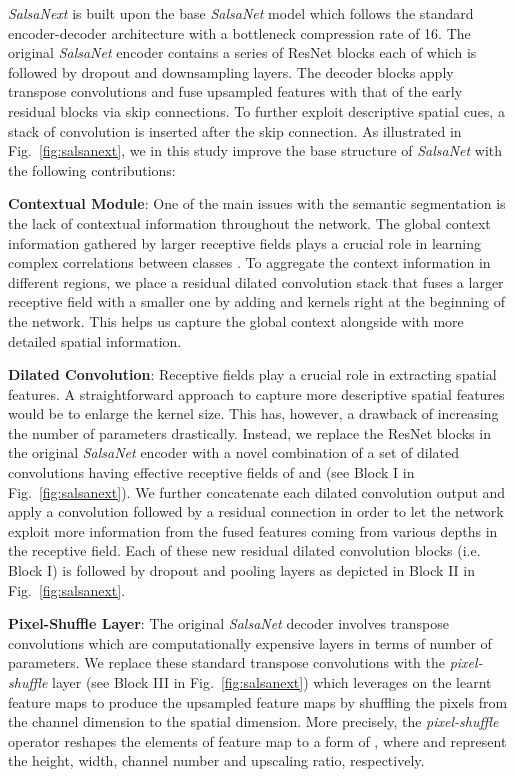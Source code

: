\documentclass[letterpaper, 10 pt, conference]{ieeeconf}
\makeatletter
\newcommand{\snx}[1]{\textit{SalsaNext }{#1}}
\newcommand{\sn}[1]{\textit{SalsaNet }{#1}}
\def\ie{i.e.\@\xspace}
\makeatother
\begin{document}
\snx  is built upon the base  \sn model \cite{salsanet2020} which follows the standard encoder-decoder architecture with a bottleneck compression rate of 16. The original \sn encoder contains a series of ResNet blocks \cite{resnet2016} each of which 
is followed by dropout and downsampling layers. 
The decoder blocks apply  transpose convolutions and fuse upsampled features with that of the early residual blocks via skip connections. To further exploit descriptive spatial cues, a stack  of convolution is inserted  after the skip connection. 
As illustrated in Fig.~\ref{fig:salsanext},   we in this study  improve  the base structure of \sn with the following contributions:





\textbf{Contextual Module}: 
One of the main issues with the semantic segmentation is the lack of contextual information throughout the network.
The global context information gathered by larger receptive fields plays a crucial role in learning complex correlations between classes \cite{FastSCNN2019}.  
To aggregate the context information in different regions, we place a residual dilated convolution stack that fuses a larger receptive field with a smaller one by adding   and      kernels right at the beginning of the network. This  helps us capture the global context alongside with more detailed spatial information. 
 
\textbf{Dilated Convolution}: Receptive fields play a crucial role in extracting spatial features. A  straightforward approach to capture more descriptive spatial features would be to enlarge the kernel size. This has, however, a drawback of increasing the number of parameters drastically. Instead, we replace  the ResNet blocks in the original \sn encoder with a novel combination of a set of dilated convolutions having effective receptive fields of  and  (see Block I in Fig.~\ref{fig:salsanext}). We further concatenate each  dilated convolution output and apply a  convolution followed by a residual connection in order to let the network   exploit more information from the fused features coming from various depths in the receptive field. 
Each of these new residual dilated convolution blocks (\ie Block I) is followed by dropout and pooling layers as depicted in Block II in Fig.~\ref{fig:salsanext}. 

\textbf{Pixel-Shuffle Layer}:
The original \sn decoder involves transpose convolutions which are computationally expensive layers in terms of number of parameters. We replace these standard transpose convolutions with the \textit{pixel-shuffle} layer \cite{pixelshuffle} (see Block III in Fig.~\ref{fig:salsanext}) which leverages on the learnt feature maps to produce the upsampled feature maps by shuffling the pixels from the channel dimension to the spatial dimension. More precisely, the \textit{pixel-shuffle} operator reshapes the elements of  feature map to a form of , where  and  represent the height, width, channel number and upscaling ratio, respectively. 
\end{document}
